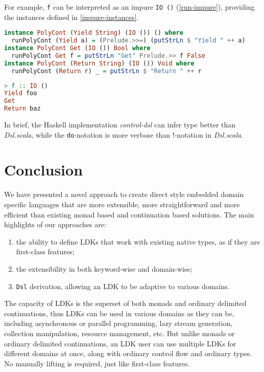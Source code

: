 For example, \lstinline{f} can be interpreted as an impure \lstinline{IO ()} (\cref{run-impure}), providing the instances defined in \cref{impure-instances}.

\begin{lstlisting}[float=htbp,language={Haskell},caption={Custom effectful instances for built-in LDKs},label={impure-instances}]
instance PolyCont (Yield String) (IO ()) () where
  runPolyCont (Yield a) = (Prelude.>>=) (putStrLn $ "Yield " ++ a)
instance PolyCont Get (IO ()) Bool where
  runPolyCont Get f = putStrLn "Get" Prelude.>> f False
instance PolyCont (Return String) (IO ()) Void where
  runPolyCont (Return r) _ = putStrLn $ "Return " ++ r
\end{lstlisting}

\begin{lstlisting}[float=htbp,language={Haskell},caption={Running \lstinline{f} effectfuly in REPL},label={run-impure}]
> f :: IO ()
Yield foo
Get
Return baz
\end{lstlisting}

In brief, the Haskell implementation \textit{control-dsl} can infer type better than \textit{Dsl.scala}, while the \lstinline{do}-notation is more verbose than !-notation in \textit{Dsl.scala}.

\section{Conclusion}

We have presented a novel approach to create direct style embedded domain specific languages that are more extensible, more straightforward and more efficient than existing monad based and continuation based solutions. The main highlights of our approaches are:

\begin{enumerate}
  \item the ability to define LDKs that work with existing native types, as if they are first-class features;
  \item the extensibility in both keyword-wise and domain-wise;
  \item \lstinline{Dsl} derivation, allowing an LDK to be adaptive to various domains.
\end{enumerate}

The capacity of LDKs is the superset of both monads and ordinary delimited continuations, thus LDKs can be used in various domains as they can be, including asynchronous or parallel programming, lazy stream generation, collection manipulation, resource management, etc. But unlike monads or ordinary delimited continuations, an LDK user can use multiple LDKs for different domains at once, along with ordinary control flow and ordinary types. No manually lifting is required, just like first-class features.

